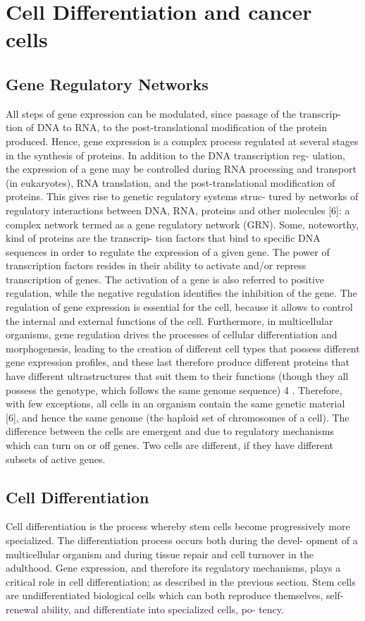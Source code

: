 \chapter{Cell Differentiation and cancer cells}\label{celldiff}
\lhead[\fancyplain{}{\bfseries\thepage}]{\fancyplain{}{\bfseries\rightmark}}


\section{Gene Regulatory Networks}

All steps of gene expression can be modulated, since passage of the transcrip-
tion of DNA to RNA, to the post-translational modification of the protein
produced. Hence, gene expression is a complex process regulated at several
stages in the synthesis of proteins. In addition to the DNA transcription reg-
ulation, the expression of a gene may be controlled during RNA processing
and transport (in eukaryotes), RNA translation, and the post-translational
modification of proteins. This gives rise to genetic regulatory systems struc-
tured by networks of regulatory interactions between DNA, RNA, proteins
and other molecules [6]: a complex network termed as a gene regulatory
network (GRN). Some, noteworthy, kind of proteins are the transcrip-
tion factors that bind to specific DNA sequences in order to regulate the
expression of a given gene. The power of transcription factors resides in their
ability to activate and/or repress transcription of genes. The activation of
a gene is also referred to positive regulation, while the negative regulation
identifies the inhibition of the gene.
The regulation of gene expression is essential for the cell, because it
allows to control the internal and external functions of the cell. Furthermore,
in multicellular organisms, gene regulation drives the processes of cellular
differentiation and morphogenesis, leading to the creation of different cell
types that possess different gene expression profiles, and these last therefore
produce different proteins that have different ultrastructures that suit them
to their functions (though they all possess the genotype, which follows the
same genome sequence) 4 . Therefore, with few exceptions, all cells in an
organism contain the same genetic material [6], and hence the same genome
(the haploid set of chromosomes of a cell). The difference between the cells
are emergent and due to regulatory mechanisms which can turn on or off
genes. Two cells are different, if they have different subsets of active genes.

\section{Cell Differentiation}
Cell differentiation is the process whereby stem cells become progressively
more specialized. The differentiation process occurs both during the devel-
opment of a multicellular organism and during tissue repair and cell turnover
in the adulthood. Gene expression, and therefore its regulatory mechanisms,
plays a critical role in cell differentiation; as described in the previous section.
Stem cells are undifferentiated biological cells which can both reproduce
themselves, self-renewal ability, and differentiate into specialized cells, po-
tency.
